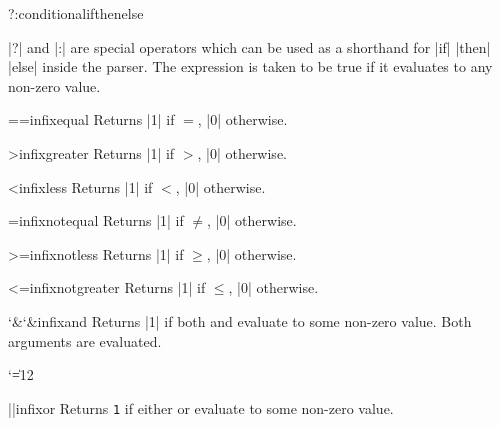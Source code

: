 \begin{math-operators}{?}{:}{conditional}{ifthenelse}

  |?| and |:| are special operators which can be used as a shorthand
  for |if|  |then|  |else|  inside the parser.
  The expression  is taken to be true if it evaluates to any
  non-zero value.

\end{math-operators}

\begin{math-operator}{==}{infix}{equal}
  Returns |1| if $=$, |0| otherwise.
\end{math-operator}

\begin{math-operator}{>}{infix}{greater}
  Returns |1| if $>$, |0| otherwise.
\end{math-operator}

\begin{math-operator}{<}{infix}{less}
  Returns |1| if $<$, |0| otherwise.
\end{math-operator}

\begin{math-operator}{\protect\exclamationmarktext=}{infix}{notequal}
  Returns |1| if $\neq$, |0| otherwise.
\end{math-operator}

\begin{math-operator}{>=}{infix}{notless}
  Returns |1| if $\geq$, |0| otherwise.
\end{math-operator}

\begin{math-operator}{<=}{infix}{notgreater}
  Returns |1| if $\leq$, |0| otherwise.
\end{math-operator}

\begin{math-operator}{{\char`\&}{\char`\&}}{infix}{and}
  Returns |1| if both  and  evaluate to some
  non-zero value. Both arguments are evaluated.
\end{math-operator}



{
 \catcode`\|=12
\begin{math-operator}[no index]{||}{infix}{or}
  Returns {\tt 1} if either  or  evaluate to some
  non-zero value.
\end{math-operator}
}

